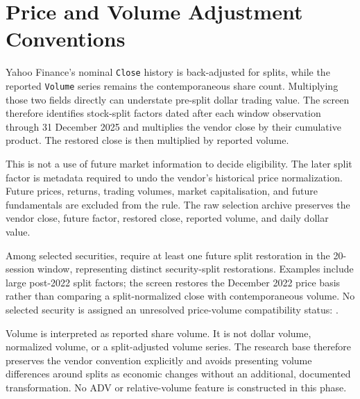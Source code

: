 \section{Price and Volume Adjustment Conventions}
\label{sec:price-volume}

Yahoo Finance's nominal \texttt{Close} history is back-adjusted for splits,
while the reported \texttt{Volume} series remains the contemporaneous share
count. Multiplying those two fields directly can understate pre-split dollar
trading value. The screen therefore identifies stock-split factors dated after
each window observation through 31 December 2025 and multiplies the vendor
close by their cumulative product. The restored close is then multiplied by
reported volume.

This is not a use of future market information to decide eligibility. The later
split factor is metadata required to undo the vendor's historical price
normalization. Future prices, returns, trading volumes, market capitalisation,
and future fundamentals are excluded from the rule. The raw selection archive
preserves the vendor close, future factor, restored close, reported volume, and
daily dollar value.

Among selected securities, \SelectedWithFutureSplitAdjustment{} require at
least one future split restoration in the 20-session window, representing
\FutureSplitEventsRestored{} distinct security-split restorations. Examples
include large post-2022 split factors; the screen restores the December 2022
price basis rather than comparing a split-normalized close with
contemporaneous volume. No selected security is assigned an unresolved
price-volume compatibility status: \UnresolvedPriceVolume{}.

Volume is interpreted as reported share volume. It is not dollar volume,
normalized volume, or a split-adjusted volume series. The research base
therefore preserves the vendor convention explicitly and avoids presenting
volume differences around splits as economic changes without an additional,
documented transformation. No ADV or relative-volume feature is constructed in
this phase.
